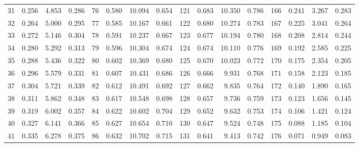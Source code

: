 \begin{table}
{\begin{tabular}{rrrr|rrrr|rrrr|rrrr}
 31 & \tiny{  0.256} &   4.853 & \tiny{  0.286} &  76 & \tiny{  0.580} &  10.094 & \tiny{  0.654} & 121 & \tiny{  0.683} &  10.350 & \tiny{  0.786} & 166 & \tiny{  0.241} &   3.267 & \tiny{  0.283}\\
 32 & \tiny{  0.264} &   5.000 & \tiny{  0.295} &  77 & \tiny{  0.585} &  10.167 & \tiny{  0.661} & 122 & \tiny{  0.680} &  10.274 & \tiny{  0.783} & 167 & \tiny{  0.225} &   3.041 & \tiny{  0.264}\\
 33 & \tiny{  0.272} &   5.146 & \tiny{  0.304} &  78 & \tiny{  0.591} &  10.237 & \tiny{  0.667} & 123 & \tiny{  0.677} &  10.194 & \tiny{  0.780} & 168 & \tiny{  0.208} &   2.814 & \tiny{  0.244}\\
 34 & \tiny{  0.280} &   5.292 & \tiny{  0.313} &  79 & \tiny{  0.596} &  10.304 & \tiny{  0.674} & 124 & \tiny{  0.674} &  10.110 & \tiny{  0.776} & 169 & \tiny{  0.192} &   2.585 & \tiny{  0.225}\\
 35 & \tiny{  0.288} &   5.436 & \tiny{  0.322} &  80 & \tiny{  0.602} &  10.369 & \tiny{  0.680} & 125 & \tiny{  0.670} &  10.023 & \tiny{  0.772} & 170 & \tiny{  0.175} &   2.354 & \tiny{  0.205}\\
 36 & \tiny{  0.296} &   5.579 & \tiny{  0.331} &  81 & \tiny{  0.607} &  10.431 & \tiny{  0.686} & 126 & \tiny{  0.666} &   9.931 & \tiny{  0.768} & 171 & \tiny{  0.158} &   2.123 & \tiny{  0.185}\\
 37 & \tiny{  0.304} &   5.721 & \tiny{  0.339} &  82 & \tiny{  0.612} &  10.491 & \tiny{  0.692} & 127 & \tiny{  0.662} &   9.835 & \tiny{  0.764} & 172 & \tiny{  0.140} &   1.890 & \tiny{  0.165}\\
 38 & \tiny{  0.311} &   5.862 & \tiny{  0.348} &  83 & \tiny{  0.617} &  10.548 & \tiny{  0.698} & 128 & \tiny{  0.657} &   9.736 & \tiny{  0.759} & 173 & \tiny{  0.123} &   1.656 & \tiny{  0.145}\\
 39 & \tiny{  0.319} &   6.002 & \tiny{  0.357} &  84 & \tiny{  0.622} &  10.602 & \tiny{  0.704} & 129 & \tiny{  0.652} &   9.632 & \tiny{  0.753} & 174 & \tiny{  0.106} &   1.421 & \tiny{  0.124}\\
 40 & \tiny{  0.327} &   6.141 & \tiny{  0.366} &  85 & \tiny{  0.627} &  10.654 & \tiny{  0.710} & 130 & \tiny{  0.647} &   9.524 & \tiny{  0.748} & 175 & \tiny{  0.088} &   1.185 & \tiny{  0.104}\\
 41 & \tiny{  0.335} &   6.278 & \tiny{  0.375} &  86 & \tiny{  0.632} &  10.702 & \tiny{  0.715} & 131 & \tiny{  0.641} &   9.413 & \tiny{  0.742} & 176 & \tiny{  0.071} &   0.949 & \tiny{  0.083}\\

\end{tabular}}
\end{table}
